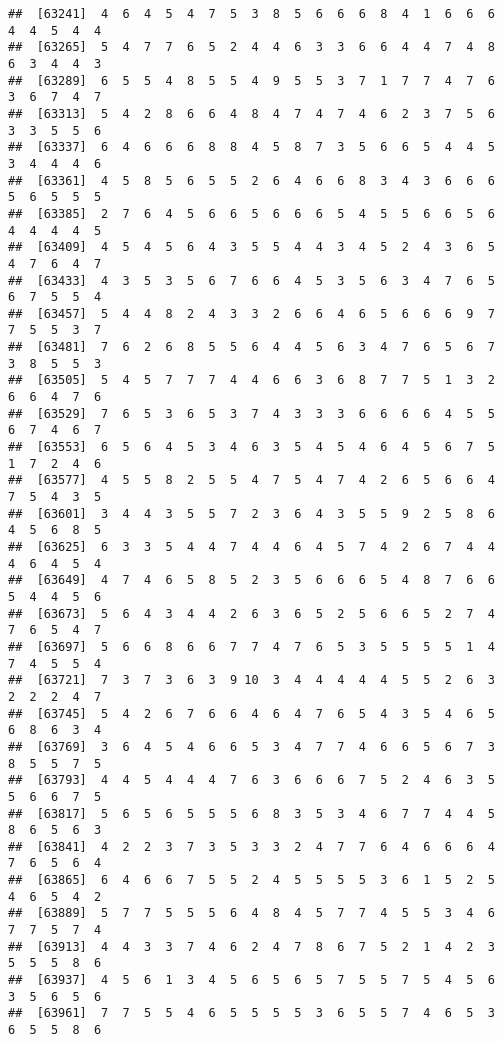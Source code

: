 \documentclass[
]{book}
\begin{document}
\begin{verbatim}
##  [63241]  4  6  4  5  4  7  5  3  8  5  6  6  6  8  4  1  6  6  6  4  4  5  4  4
##  [63265]  5  4  7  7  6  5  2  4  4  6  3  3  6  6  4  4  7  4  8  6  3  4  4  3
##  [63289]  6  5  5  4  8  5  5  4  9  5  5  3  7  1  7  7  4  7  6  3  6  7  4  7
##  [63313]  5  4  2  8  6  6  4  8  4  7  4  7  4  6  2  3  7  5  6  3  3  5  5  6
##  [63337]  6  4  6  6  6  8  8  4  5  8  7  3  5  6  6  5  4  4  5  3  4  4  4  6
##  [63361]  4  5  8  5  6  5  5  2  6  4  6  6  8  3  4  3  6  6  6  5  6  5  5  5
##  [63385]  2  7  6  4  5  6  6  5  6  6  6  5  4  5  5  6  6  5  6  4  4  4  4  5
##  [63409]  4  5  4  5  6  4  3  5  5  4  4  3  4  5  2  4  3  6  5  4  7  6  4  7
##  [63433]  4  3  5  3  5  6  7  6  6  4  5  3  5  6  3  4  7  6  5  6  7  5  5  4
##  [63457]  5  4  4  8  2  4  3  3  2  6  6  4  6  5  6  6  6  9  7  7  5  5  3  7
##  [63481]  7  6  2  6  8  5  5  6  4  4  5  6  3  4  7  6  5  6  7  3  8  5  5  3
##  [63505]  5  4  5  7  7  7  4  4  6  6  3  6  8  7  7  5  1  3  2  6  6  4  7  6
##  [63529]  7  6  5  3  6  5  3  7  4  3  3  3  6  6  6  6  4  5  5  6  7  4  6  7
##  [63553]  6  5  6  4  5  3  4  6  3  5  4  5  4  6  4  5  6  7  5  1  7  2  4  6
##  [63577]  4  5  5  8  2  5  5  4  7  5  4  7  4  2  6  5  6  6  4  7  5  4  3  5
##  [63601]  3  4  4  3  5  5  7  2  3  6  4  3  5  5  9  2  5  8  6  4  5  6  8  5
##  [63625]  6  3  3  5  4  4  7  4  4  6  4  5  7  4  2  6  7  4  4  4  6  4  5  4
##  [63649]  4  7  4  6  5  8  5  2  3  5  6  6  6  5  4  8  7  6  6  5  4  4  5  6
##  [63673]  5  6  4  3  4  4  2  6  3  6  5  2  5  6  6  5  2  7  4  7  6  5  4  7
##  [63697]  5  6  6  8  6  6  7  7  4  7  6  5  3  5  5  5  5  1  4  7  4  5  5  4
##  [63721]  7  3  7  3  6  3  9 10  3  4  4  4  4  4  5  5  2  6  3  2  2  2  4  7
##  [63745]  5  4  2  6  7  6  6  4  6  4  7  6  5  4  3  5  4  6  5  6  8  6  3  4
##  [63769]  3  6  4  5  4  6  6  5  3  4  7  7  4  6  6  5  6  7  3  8  5  5  7  5
##  [63793]  4  4  5  4  4  4  7  6  3  6  6  6  7  5  2  4  6  3  5  5  6  6  7  5
##  [63817]  5  6  5  6  5  5  5  6  8  3  5  3  4  6  7  7  4  4  5  8  6  5  6  3
##  [63841]  4  2  2  3  7  3  5  3  3  2  4  7  7  6  4  6  6  6  4  7  6  5  6  4
##  [63865]  6  4  6  6  7  5  5  2  4  5  5  5  5  3  6  1  5  2  5  4  6  5  4  2
##  [63889]  5  7  7  5  5  5  6  4  8  4  5  7  7  4  5  5  3  4  6  7  7  5  7  4
##  [63913]  4  4  3  3  7  4  6  2  4  7  8  6  7  5  2  1  4  2  3  5  5  5  8  6
##  [63937]  4  5  6  1  3  4  5  6  5  6  5  7  5  5  7  5  4  5  6  3  5  6  5  6
##  [63961]  7  7  5  5  4  6  5  5  5  5  3  6  5  5  7  4  6  5  3  6  5  5  8  6

\end{verbatim}
\end{document}

